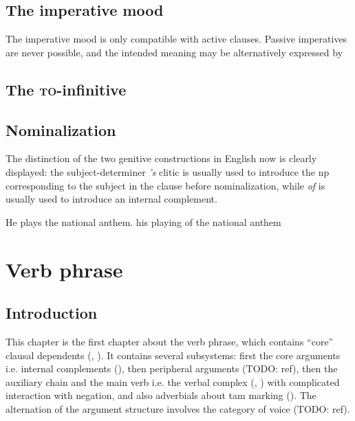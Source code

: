 \documentclass[UTF8, a4paper, oneside, scheme=plain, 12pt]{ctexbook}
\newcommand{\form}[1]{\emph{#1}}
\newcommand{\formcat}[1]{\textsc{#1}}
\begin{document}
\section{The imperative mood}

The imperative mood is only compatible with active clauses.
Passive imperatives are never possible, 
and the intended meaning may be alternatively expressed by 

\section{The \formcat{to}-infinitive}

\section{Nominalization}

The distinction of the two genitive constructions in English 
now is clearly displayed:
the subject-determiner \form{'s} clitic 
is usually used to introduce the \ac{np} corresponding to 
the subject in the clause before nominalization,
while \form{of} is usually used to introduce 
an internal complement.

\begin{exe}
    \ex \begin{xlist}
        \ex He plays the national anthem.
        \ex his playing of the national anthem
    \end{xlist}
\end{exe}


\chapter{Verb phrase}\label{chap:verb-phrase}

\section{Introduction}

This chapter is the first chapter about the verb phrase,
which contains ``core'' clausal dependents 
(, ).
It contains several subsystems: 
first the core arguments i.e. internal complements (),
then peripheral arguments (TODO: ref), 
then the auxiliary chain and the main verb i.e. the verbal complex
(, ) 
with complicated interaction with negation, 
and also adverbials about \acs{tam} marking 
(). 
The alternation of the argument structure involves the category of voice (TODO: ref).
\end{document}

